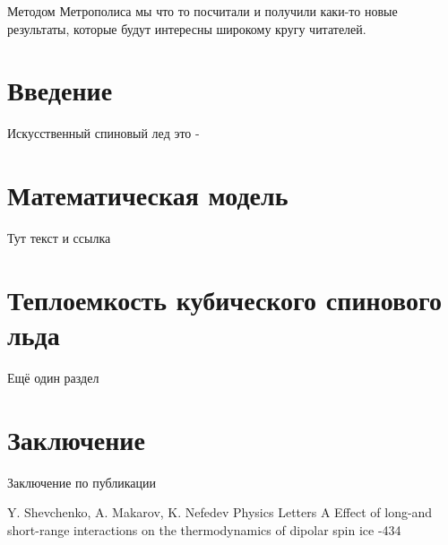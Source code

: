 \documentclass[10pt]{article}
\begin{document}
\makeface



\abstract Методом Метрополиса мы что то посчитали и получили каки-то новые результаты, которые будут интересны широкому кругу читателей.



\section*{Введение}

Искусственный спиновый лед это - 

\section{Математическая модель} 

Тут текст и ссылка \cite{shevchenko2017}

\section {Теплоемкость кубического спинового льда}

Ещё один раздел

\section{Заключение}

Заключение по публикации


\begin{thebibliography}{20}
\setlength{\parsep}{0pt}\setlength{\itemsep}{3pt}

\by Y. Shevchenko, A. Makarov, K. Nefedev
\jour Physics Letters A
\paper Effect of long-and short-range interactions on the thermodynamics of dipolar spin ice
-434

\end{thebibliography}



\EndArticle
\end{document}

